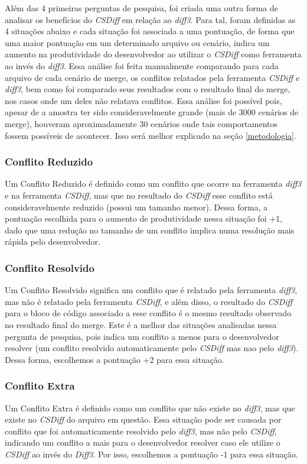 Além das 4 primeiras perguntas de pesquisa, foi criada uma outra forma de analisar os benefícios do \emph{CSDiff} em relação ao
\emph{diff3}.
Para tal, foram definidas as 4 situações abaixo e cada situação foi associada a uma pontuação, de forma que
uma maior pontuação em um determinado arquivo ou cenário, indica um aumento na produtividade do desenvolvedor ao
utilizar o \emph{CSDiff} como ferramenta ao invés do \emph{diff3}. Essa análise foi feita manualmente comparando para cada
arquivo
de cada cenário de merge, os conflitos relatados pela
ferramenta \emph{CSDiff} e \emph{diff3}, bem como foi comparado seus resultados
com o resultado final do merge, nos casos onde um deles não relatava conflitos. Essa análise foi possível pois, apesar de
a amostra ter sido consideravelmente grande (mais de 3000 cenários de merge), houveram aproximadamente 30 cenários onde
tais comportamentos fossem possíveis de acontecer. Isso será melhor explicado na seção \ref{metodologia}.
\subsubsection{Conflito Reduzido}
Um Conflito Reduzido é definido como um conflito que ocorre na ferramenta \emph{diff3} e na ferramenta \emph{CSDiff},
mas que no resultado do \emph{CSDiff} esse conflito está consideravelmente reduzido (possui um tamanho menor). Dessa forma,
a pontuação escolhida para o aumento de produtividade nessa situação foi +1, dado que uma redução no tamanho de um conflito
implica numa resolução mais rápida pelo desenvolvedor.
\subsubsection{Conflito Resolvido}
Um Conflito Resolvido significa um conflito que é relatado pela ferramenta \emph{diff3},
mas não é relatado pela ferramenta \emph{CSDiff}, e
além disso, o resultado do \emph{CSDiff} para o bloco de código associado a esse conflito é o mesmo resultado
observado no resultado
final do merge. Este é a melhor das situações analisadas nessa pergunta de pesquisa, pois indica um conflito a menos para o
desenvolvedor resolver (um conflito resolvido automaticamente pelo \emph{CSDiff} mas nao pelo \emph{diff3}). Dessa forma,
escolhemos a pontuação +2 para essa situação.
\subsubsection{Conflito Extra}
Um Conflito Extra é definido como um conflito que não existe
no \emph{diff3}, mas que existe no \emph{CSDiff} do arquivo em questão. Essa
situação pode ser causada por conflito que foi automaticamente
resolvido pelo \emph{diff3}, mas não pelo \emph{CSDiff}, indicando um conflito
a mais para o desenvolvedor resolver caso ele utilize o \emph{CSDiff}
ao invés do \emph{Diff3}. Por isso, escolhemos a pontuação -1 para essa
situação.
